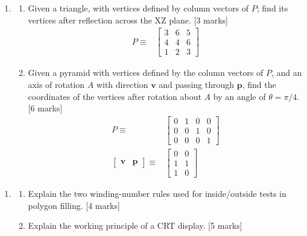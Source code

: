 \documentclass[11pt,a4paper,onecolumn]{tiet-question-paper}
\begin{document}
\begin{enumerate}[resume]
\item
  \begin{enumerate}
  \item Given a triangle, with vertices defined by
    column vectors of $P$; find its vertices after
    reflection across the XZ plane. \hfill [3 marks]
    \begin{align*}
      P\equiv
      &\begin{bmatrix}
        3&6&5 \\ 4&4&6 \\ 1&2&3
      \end{bmatrix}
    \end{align*}
  \item Given a pyramid with vertices defined by the
    column vectors of $P$, and an axis of rotation $A$
    with direction $\textbf{v}$ and passing through
    $\textbf{p}$, find the coordinates of the vertices
    after rotation about $A$ by an angle of
    $\theta=\pi/4$.\hfill [6 marks]
    \begin{align*}
      P\equiv
      &\begin{bmatrix}
        0&1&0&0 \\ 0&0&1&0 \\0&0&0&1
      \end{bmatrix} \\
      \begin{bmatrix}
        \mathbf{v} & \mathbf{p}
      \end{bmatrix}\equiv
      &\begin{bmatrix}
        0&0 \\1&1\\1&0
      \end{bmatrix}
    \end{align*}
  \end{enumerate}
\end{enumerate}
\bvrhrule[0.4pt]
\begin{enumerate}[resume]
\item
  \begin{enumerate}
    \item Explain the two winding-number rules used for
      inside/outside tests in polygon filling. \hfill [4 marks]
    \item Explain the working principle of a
      CRT display. \hfill [5 marks]
  \end{enumerate}
\end{enumerate}
\bvrhrule[0.4pt]
\end{document}
